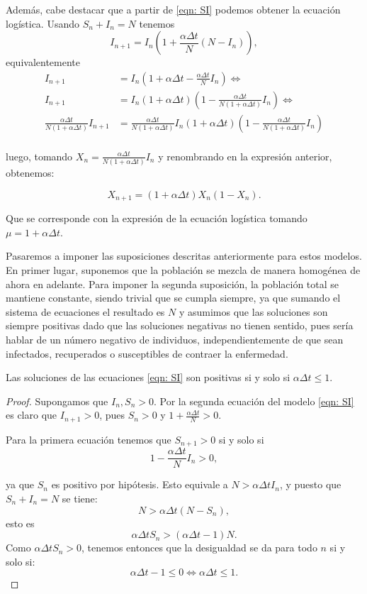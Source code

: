 Además, cabe destacar que a partir de \eqref{eqn: SI} podemos obtener la ecuación logística. Usando $S_n+I_n=N$ tenemos
$$I_{n+1} = I_n \left( 1+\frac{\alpha\Delta t}{N} (N-I_n)\right) ,$$
equivalentemente
\begin{equation}
\begin{aligned}
I_{n+1} & = I_n \left( 1+\alpha\Delta t - \frac{\alpha\Delta t}{N}I_n \right) \Leftrightarrow \\
I_{n+1} & = I_n (1+\alpha\Delta t) \left( 1-\frac{\alpha\Delta t}{N(1+\alpha\Delta t)}I_n \right) \Leftrightarrow \\
\frac{\alpha\Delta t}{N(1+\alpha\Delta t)} I_{n+1} & = \frac{\alpha\Delta t}{N(1+\alpha\Delta t)}I_n(1+\alpha\Delta t) \left( 1- \frac{\alpha\Delta t}{N(1+\alpha\Delta t)} I_n \right) \\
\end{aligned}
\end{equation}

luego, tomando $X_n = \frac{\alpha\Delta t}{N(1+\alpha\Delta t)} I_n$ y renombrando en la expresión anterior, obtenemos:

$$X_{n+1} = (1 + \alpha\Delta t ) X_n(1-X_n).$$

Que se corresponde con la expresión de la ecuación logística tomando $\mu = 1+\alpha\Delta t$.


Pasaremos a imponer las suposiciones descritas anteriormente para estos modelos. En primer lugar, suponemos que la población se mezcla de manera homogénea de ahora en adelante. Para imponer la segunda suposición, la población total se mantiene constante, siendo trivial que se cumpla siempre, ya que sumando el sistema de ecuaciones el resultado es $N$ y asumimos que las soluciones son siempre positivas dado que las soluciones negativas no tienen sentido, pues sería hablar de un número negativo de individuos, independientemente de que sean infectados, recuperados o susceptibles de contraer la enfermedad.

\begin{proposition}
Las soluciones de las ecuaciones \eqref{eqn: SI} son positivas si y solo si $\alpha\Delta t \leq 1$.
\end{proposition}

\begin{proof}
Supongamos que $I_n, S_n > 0$. Por la segunda ecuación del modelo \eqref{eqn: SI} es claro que $I_{n+1}>0$, pues $S_n>0$ y $1+\frac{\alpha\Delta t}{N}>0$.

Para la primera ecuación tenemos que $S_{n+1} > 0$ si y solo si
$$1-\frac{\alpha\Delta t}{N}I_n >0,$$

ya que $S_n$ es positivo por hipótesis. Esto equivale a $N>\alpha \Delta t I_n$, y puesto que $S_n+I_n=N$ se tiene:
$$N>\alpha\Delta t(N-S_n),$$
esto es
$$\alpha\Delta t S_n > (\alpha\Delta t -1) N.$$
Como $\alpha\Delta t S_n > 0$, tenemos entonces que la desigualdad se da para todo $n$ si y solo si:
$$\alpha\Delta t -1 \leq 0 \Leftrightarrow \alpha\Delta t \leq 1.$$
\end{proof}

